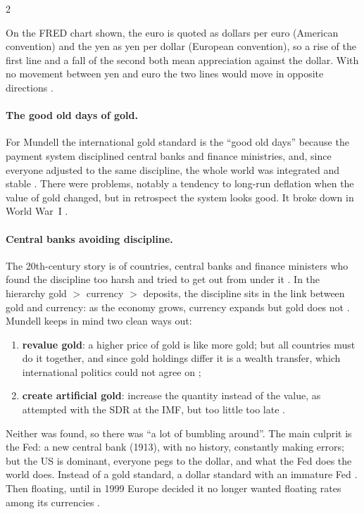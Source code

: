 \begin{paracol}{2}
\begin{coursenote}
On the FRED chart shown, the euro is quoted as dollars per euro (American convention) and the yen as yen per dollar (European convention), so a rise of the
first line and a fall of the second both mean appreciation against the dollar. With no movement between yen and euro the two lines would move in opposite
directions .
\end{coursenote}

\paragraph{The good old days of gold.} For Mundell the international gold standard is the ``good old days'' because the payment system disciplined central banks
and finance ministries, and, since everyone adjusted to the same discipline, the whole world was integrated and stable .
There were problems, notably a tendency to long-run deflation when the value of gold changed, but in retrospect the system looks good. It broke down in World
War~I .

\paragraph{Central banks avoiding discipline.} The 20th-century story is of countries, central banks and finance ministers who found the discipline too harsh and tried
to get out from under it . In the hierarchy gold $>$ currency $>$ deposits, the discipline sits in the link between gold and
currency: as the economy grows, currency expands but gold does not . Mundell keeps in mind two clean ways out:
\begin{enumerate}
  \item \textbf{revalue gold}: a higher price of gold is like more gold; but all countries must do it together, and since gold holdings differ it is a wealth
        transfer, which international politics could not agree on ;
  \item \textbf{create artificial gold}: increase the quantity instead of the value, as attempted with the SDR at the IMF, but too little too late
        .
\end{enumerate}
Neither was found, so there was ``a lot of bumbling around''. The main culprit is the Fed: a new central bank (1913), with no history, constantly making errors;
but the US is dominant, everyone pegs to the dollar, and what the Fed does the world does. Instead of a gold standard, a dollar standard with an immature Fed
. Then floating, until in 1999 Europe decided it no longer wanted floating rates among its currencies
.


\end{paracol}
